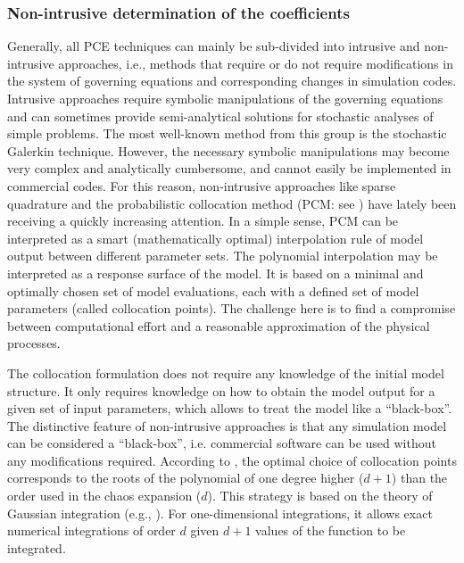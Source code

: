 \subsubsection{Non-intrusive determination of the coefficients}

Generally, all PCE techniques can mainly be sub-divided into
intrusive \cite{Ghanem1993,Matthies2005,Xiu2003} and non-intrusive \cite{Keese2003,Isukapalli1998,nLi2007,oladyshkinintegrative}
approaches, i.e., methods that require or do not require modifications in the system of governing equations and corresponding changes in
simulation codes. Intrusive approaches require symbolic manipulations of the governing
equations and can sometimes provide semi-analytical solutions for stochastic
analyses of simple problems. The most well-known method from this group is the
stochastic Galerkin technique. However, the necessary symbolic manipulations may
become very complex and analytically cumbersome, and cannot easily be
implemented in commercial codes. For this reason, non-intrusive approaches like
sparse quadrature and the probabilistic collocation method (PCM: see \cite{nLi2007,oladyshkinintegrative}) have lately been
receiving a quickly increasing attention. In a simple sense, PCM can be interpreted
as a smart (mathematically optimal) interpolation rule of model output between
different parameter sets. The polynomial interpolation may be interpreted as a
response surface of the model. It is based on a minimal and optimally chosen set of
model evaluations, each with a defined set of model parameters (called collocation
points). The challenge here is to find a compromise between computational effort and a
reasonable approximation of the physical processes.


The collocation formulation does not require any knowledge of the initial model structure. It only requires knowledge on how to obtain the model output for a given set of input parameters, which allows to treat the model  like a \textquotedblleft black-box\textquotedblright.  The distinctive feature of non-intrusive approaches is that any simulation model can be considered a ``black-box'', i.e. commercial software can be used without any modifications required.  According to \cite{Villadsen1978}, the optimal choice of collocation points corresponds to the roots of the polynomial of one degree higher ($d+1$) than the order used in the chaos expansion ($d$). This strategy is based on the theory of Gaussian integration (e.g., \cite{Abramowitz1965}). For one-dimensional integrations, it allows exact numerical integrations of order $d$ given $d+1$ values of the function to be integrated. 

